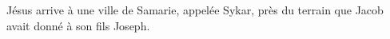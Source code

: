 \encetemps Jésus arrive à une ville de Samarie, appelée Sykar,
	près du terrain que Jacob avait donné à son fils Joseph.
